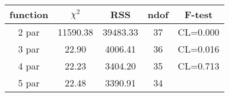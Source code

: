 \begin{tabular}{c|c|c|c|c}
function & $\chi^2$ & RSS & ndof & F-test \\
\hline
2 par & 11590.38 & 39483.33 & 37 & CL=0.000 \\
3 par & 22.90 & 4006.41 & 36 & CL=0.016 \\
4 par & 22.23 & 3404.20 & 35 & CL=0.713 \\
5 par & 22.48 & 3390.91 & 34 & \\
\hline
\end{tabular}
